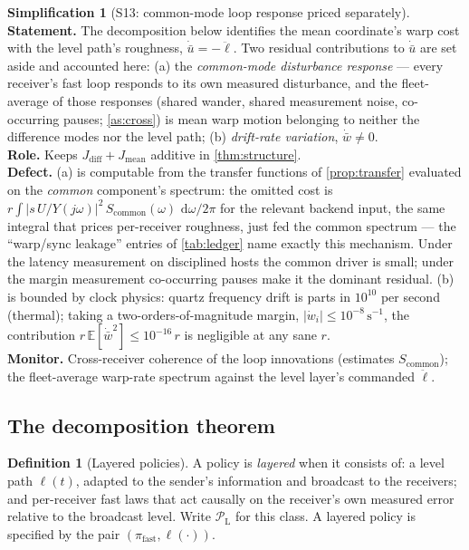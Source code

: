 \documentclass[11pt, a4paper]{article}
\theoremstyle{definition}
\newtheorem{definition}{Definition}[section]
\newtheorem{simplification}{Simplification}
\theoremstyle{plain}
\theoremstyle{remark}
\newcommand{\E}{\mathbb{E}}
\newcommand{\dd}{\,\mathrm{d}}
\begin{document}
\setcounter{simplification}{12}%
\begin{simplification}[S13: common-mode loop response priced
separately]\label{simp:commonmode}
\textbf{Statement.}  The decomposition below identifies the mean
coordinate's warp cost with the level path's roughness,
$\dot{\bar u} = -\ddot\ell$.  Two residual contributions to
$\dot{\bar u}$ are set aside and accounted here: (a) the
\emph{common-mode disturbance response} --- every receiver's fast
loop responds to its own measured disturbance, and the fleet-average
of those responses (shared wander, shared measurement noise,
co-occurring pauses; \cref{as:cross}) is mean warp motion belonging
to neither the difference modes nor the level path; (b) \emph{drift-rate
variation}, $\dot{\bar w} \ne 0$.\\
\textbf{Role.}  Keeps $J_{\mathrm{diff}} + J_{\mathrm{mean}}$
additive in \cref{thm:structure}.\\
\textbf{Defect.}  (a) is computable from the transfer functions of
\cref{prop:transfer} evaluated on the \emph{common} component's
spectrum: the omitted cost is
$r\int |s\,U/Y(j\omega)|^2\, S_{\mathrm{common}}(\omega)\,
\dd\omega/2\pi$ for the relevant backend input, the same integral
that prices per-receiver roughness, just fed the common spectrum ---
the ``warp/sync leakage'' entries of \cref{tab:ledger} name exactly
this mechanism.  Under the latency measurement on disciplined hosts
the common driver is small; under the margin measurement co-occurring
pauses make it the dominant residual.  (b) is bounded by clock
physics: quartz frequency drift is parts in $10^{10}$ per second
(thermal); taking a two-orders-of-magnitude margin,
$|\dot w_i| \le 10^{-8}\,\mathrm{s}^{-1}$, the contribution
$r\,\E[\dot{\bar w}^2] \le 10^{-16}\,r$ is negligible at any sane
$r$.\\
\textbf{Monitor.}  Cross-receiver coherence of the loop innovations
(estimates $S_{\mathrm{common}}$); the fleet-average warp-rate
spectrum against the level layer's commanded $\ddot\ell$.
\end{simplification}

\subsection{The decomposition theorem}\label{sec:decomposition-theorem}

\begin{definition}[Layered policies]\label{def:layered}
A policy is \emph{layered} when it consists of: a level path
$\ell(t)$, adapted to the sender's information and broadcast to the
receivers; and per-receiver fast laws that act causally on the
receiver's own measured error relative to the broadcast level.  Write
$\mathcal{P}_{\mathrm{L}}$ for this class.  A layered policy is
specified by the pair $(\pi_{\mathrm{fast}}, \ell(\cdot))$.
\end{definition}
\end{document}
